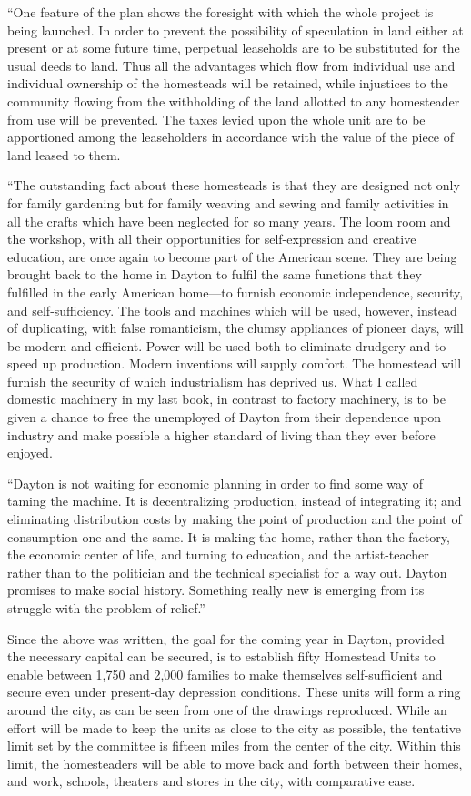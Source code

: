 \documentclass{book}
\begin{document}
“One feature of the plan shows the foresight with which the whole project is being launched. In order to prevent the possibility of speculation in land either at present or at some future time, perpetual leaseholds are to be substituted for the usual deeds to land. Thus all the advantages which flow from individual use and individual ownership of the homesteads will be retained, while injustices to the community flowing from the withholding of the land allotted to any homesteader from use will be prevented. The taxes levied upon the whole unit are to be apportioned among the leaseholders in accordance with the value of the piece of land leased to them.

“The outstanding fact about these homesteads is that they are designed not only for family gardening but for family weaving and sewing and family activities in all the crafts which have been neglected for so many years. The loom room and the workshop, with all their opportunities for self-expression and creative education, are once again to become part of the American scene. They are being brought back to the home in Dayton to fulfil the same functions that they fulfilled in the early American home—to furnish economic independence, security, and self-sufficiency. The tools and machines which will be used, however, instead of duplicating, with false romanticism, the clumsy appliances of pioneer days, will be modern and efficient. Power will be used both to eliminate drudgery and to speed up production. Modern inventions will supply comfort. The homestead will furnish the security of which industrialism has deprived us. What I called domestic machinery in my last book, in contrast to factory machinery, is to be given a chance to free the unemployed of Dayton from their dependence upon industry and make possible a higher standard of living than they ever before enjoyed.

“Dayton is not waiting for economic planning in order to find some way of taming the machine. It is decentralizing production, instead of integrating it; and eliminating distribution costs by making the point of production and the point of consumption one and the same. It is making the home, rather than the factory, the economic center of life, and turning to education, and the artist-teacher rather than to the politician and the technical specialist for a way out. Dayton promises to make social history. Something really new is emerging from its struggle with the problem of relief.”

Since the above was written, the goal for the coming year in Dayton, provided the necessary capital can be secured, is to establish fifty Homestead Units to enable between 1,750 and 2,000 families to make themselves self-sufficient and secure even under present-day depression conditions. These units will form a ring around the city, as can be seen from one of the drawings reproduced. While an effort will be made to keep the units as close to the city as possible, the tentative limit set by the committee is fifteen miles from the center of the city. Within this limit, the homesteaders will be able to move back and forth between their homes, and work, schools, theaters and stores in the city, with comparative ease.
\end{document}
